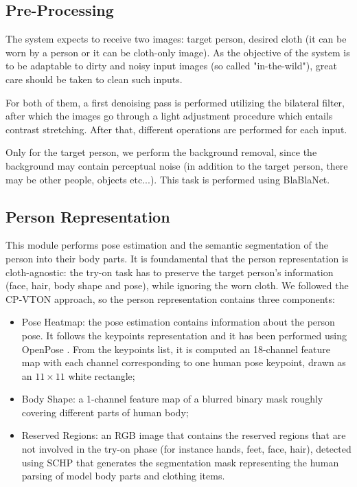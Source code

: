 \subsection{Pre-Processing}
The system expects to receive two images: target person, desired cloth (it can be worn by a person or it can be cloth-only image). As the objective of the system is to be adaptable to dirty and noisy input images (so called "in-the-wild"), great care should be taken to clean such inputs.

For both of them, a first denoising pass is performed utilizing the bilateral filter, after which the images go through a light adjustment procedure which entails contrast stretching. After that, different operations are performed for each input.

Only for the target person, we perform the background removal, since the background may contain perceptual noise (in addition to the target person, there may be other people, objects etc...). This task is performed using BlaBlaNet.



\subsection{Person Representation}
This module performs pose estimation and the semantic segmentation of the person into their body parts. It is foundamental that the person representation is cloth-agnostic: the try-on task has to preserve the target person's information (face, hair, body shape and pose), while ignoring the worn cloth. We followed the CP-VTON \citep{CP-VTON} approach, so the person representation contains three components:

\begin{itemize}[noitemsep]
\item Pose Heatmap: the pose estimation contains information about the person pose. It follows the keypoints representation and it has been performed using OpenPose \cite{openpose}. From the keypoints list, it is computed an 18-channel feature map with each channel corresponding to one human pose keypoint, drawn as an $11 \times 11$ white rectangle;

\item Body Shape: a 1-channel feature map of a blurred binary mask roughly covering different parts of human body;

\item Reserved Regions: an RGB image that contains the reserved regions that are not involved in the try-on phase (for instance hands, feet, face, hair), detected using SCHP \cite{li2019selfcorrection} that generates the segmentation mask representing the human parsing of model body parts and clothing items.
\end{itemize}


